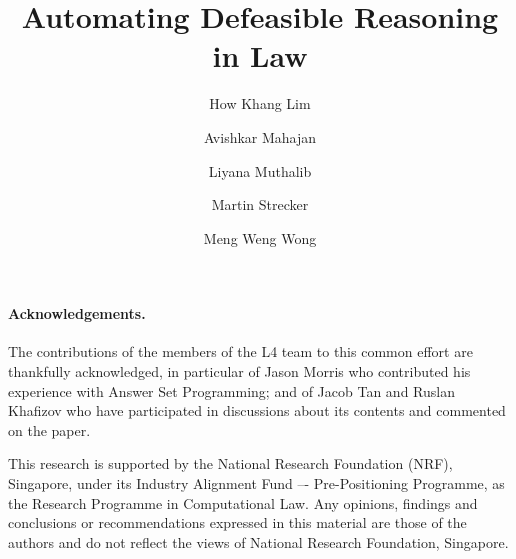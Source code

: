 \documentclass[runningheads]{llncs}
\begin{document}
\title{Automating Defeasible Reasoning in Law}

\author{How Khang Lim\and
  Avishkar Mahajan \and
  Liyana Muthalib \and
  Martin Strecker \and
  Meng Weng Wong
  }
\maketitle

\begin{abstract}

\end{abstract}















\paragraph{Acknowledgements.}
The contributions of the members of the L4 team to this common effort are thankfully acknowledged, in particular of Jason Morris who contributed his experience with Answer Set Programming; and of Jacob Tan and Ruslan Khafizov who have participated in discussions about its contents and commented on the paper.

This research is supported by the National Research Foundation (NRF),
Singapore, under its Industry Alignment Fund –- Pre-Positioning Programme, as
the Research Programme in Computational Law. Any opinions, findings and
conclusions or recommendations expressed in this material are those of the
authors and do not reflect the views of National Research Foundation,
Singapore.






\newpage
\appendix




\end{document}
